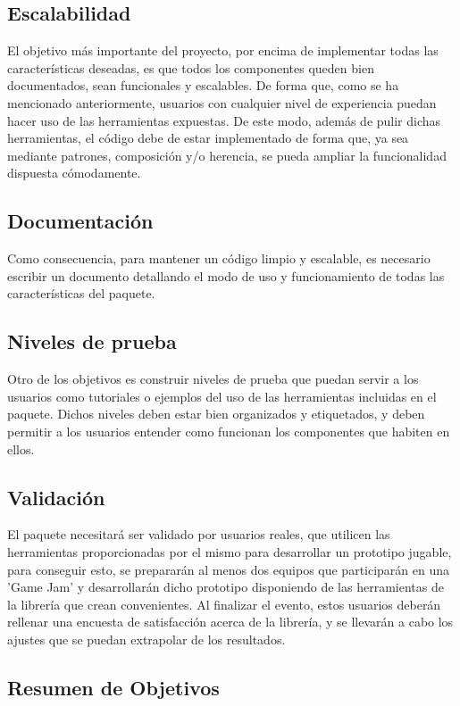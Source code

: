 \subsection{Escalabilidad}
El objetivo más importante del proyecto, por encima de implementar todas las características deseadas, es que todos los componentes queden bien documentados, sean funcionales
 y escalables. De forma que, como se ha mencionado anteriormente, usuarios con cualquier nivel de experiencia puedan hacer uso de las herramientas expuestas. De este modo, 
 además de pulir dichas herramientas, el código debe de estar implementado de forma que, ya sea mediante patrones, composición y/o herencia, se pueda ampliar la funcionalidad dispuesta
 cómodamente.
 
\subsection{Documentación}
Como consecuencia, para mantener un código limpio y escalable, es necesario escribir un documento detallando el modo de uso y funcionamiento de todas las características del paquete.

\subsection{Niveles de prueba}
Otro de los objetivos es construir niveles de prueba que puedan servir a los usuarios como tutoriales o ejemplos del uso de las herramientas incluidas en el paquete. Dichos 
 niveles deben estar bien organizados y etiquetados, y deben permitir a los usuarios entender como funcionan los componentes que habiten en ellos.

\subsection{Validación}

El paquete necesitará ser validado por usuarios reales, que utilicen las herramientas proporcionadas por el mismo para desarrollar un prototipo jugable, para conseguir esto,
 se prepararán al menos dos equipos que participarán en una 'Game Jam' y desarrollarán dicho prototipo disponiendo de las herramientas de la librería que crean convenientes.
 Al finalizar el evento, estos usuarios deberán rellenar una encuesta de satisfacción acerca de la librería, y se llevarán a cabo los ajustes que se puedan extrapolar de
 los resultados.  

\subsection{Resumen de Objetivos}

